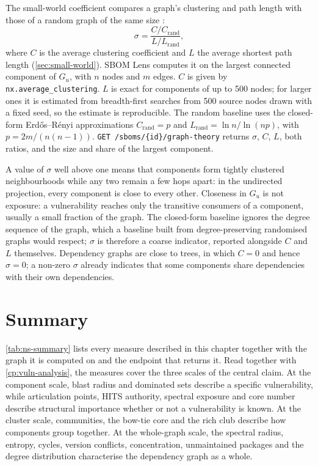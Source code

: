 The small-world coefficient compares a graph's clustering and path length with those of a random graph of the same size \citep{WattsStrogatz1998,HumphriesGurney2008}:
\[
    \sigma = \frac{C / C_{\mathrm{rand}}}{L / L_{\mathrm{rand}}},
\]
where \(C\) is the average clustering coefficient and \(L\) the average shortest path length (\autoref{sec:small-world}). SBOM Lens computes it on the largest connected component of \(G_u\), with \(n\) nodes and \(m\) edges. \(C\) is given by \texttt{nx.average\_clustering}. \(L\) is exact for components of up to 500 nodes; for larger ones it is estimated from breadth-first searches from 500 source nodes drawn with a fixed seed, so the estimate is reproducible. The random baseline uses the closed-form Erdős--Rényi approximations \(C_{\mathrm{rand}} = p\) and \(L_{\mathrm{rand}} = \ln n / \ln (np)\), with \(p = 2m / (n(n-1))\). \texttt{GET /sboms/\{id\}/graph-theory} returns \(\sigma\), \(C\), \(L\), both ratios, and the size and share of the largest component.

A value of \(\sigma\) well above one means that components form tightly clustered neighbourhoods while any two remain a few hops apart: in the undirected projection, every component is close to every other. Closeness in \(G_u\) is not exposure: a vulnerability reaches only the transitive consumers of a component, usually a small fraction of the graph. The closed-form baseline ignores the degree sequence of the graph, which a baseline built from degree-preserving randomised graphs would respect; \(\sigma\) is therefore a coarse indicator, reported alongside \(C\) and \(L\) themselves. Dependency graphs are close to trees, in which \(C = 0\) and hence \(\sigma = 0\); a non-zero \(\sigma\) already indicates that some components share dependencies with their own dependencies.


\section{Summary}
\label{sec:ns-summary}

\autoref{tab:ns-summary} lists every measure described in this chapter together with the graph it is computed on and the endpoint that returns it. Read together with \autoref{cp:vuln-analysis}, the measures cover the three scales of the central claim. At the component scale, blast radius and dominated sets describe a specific vulnerability, while articulation points, HITS authority, spectral exposure and core number describe structural importance whether or not a vulnerability is known. At the cluster scale, communities, the bow-tie core and the rich club describe how components group together. At the whole-graph scale, the spectral radius, entropy, cycles, version conflicts, concentration, unmaintained packages and the degree distribution characterise the dependency graph as a whole.

